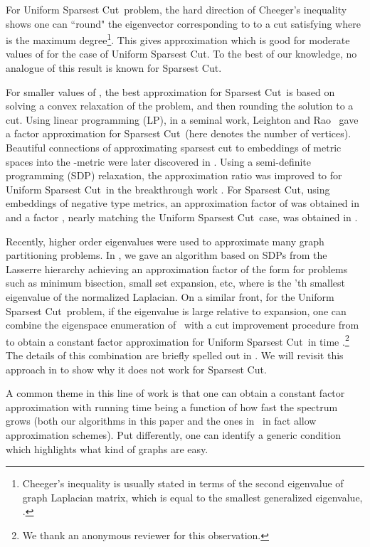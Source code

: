 \documentclass{article}
\newcommand{\usc}{\textsc{\sf Uniform Sparsest Cut}}
\newcommand{\nusc}{\textsc{\sf Non-Uniform Sparsest Cut}}
\newcounter{alg-count}
\renewcommand{\nusc}{{\sc Sparsest Cut}}
\renewcommand{\usc}{{\sc Uniform Sparsest Cut}}
\begin{document}
For \usc\ problem, the hard direction of Cheeger's inequality shows
one can ``round" the eigenvector corresponding to  to a cut
 satisfying  where
 is the maximum degree\footnote{Cheeger's inequality is
  usually stated in terms of the second eigenvalue of graph Laplacian
  matrix, which is equal to the smallest generalized eigenvalue,
  .}.
This gives  approximation which is good for
moderate values of  for the case of \usc. To the best of
our knowledge, no analogue of this result is known for \nusc.

For smaller values of , the best approximation for \nusc\
is based on solving a convex relaxation of the problem, and then
rounding the solution to a cut. Using linear programming (LP), in a
seminal work, Leighton and Rao~\cite{LR} gave a factor 
approximation for \nusc\ (here  denotes the number of
vertices). Beautiful connections of approximating sparsest cut to
embeddings of metric spaces into the -metric were later
discovered in \cite{llr,ar}.  Using a semi-definite programming (SDP)
relaxation, the approximation ratio was improved to 
for \usc \ in the breakthrough work \cite{ARV}. For \nusc, using
 embeddings of negative type metrics, an approximation factor
of  was obtained in \cite{CGR} and a factor
, nearly matching the \usc \ case, was
obtained in \cite{ALN}.

Recently, higher order eigenvalues were used to approximate many graph
partitioning problems. In \cite{gs11-qip}, we gave an algorithm based
on SDPs from the Lasserre hierarchy achieving an approximation factor
of the form  for problems such
as minimum bisection, small set expansion, etc, where
 is the 'th smallest eigenvalue of the
normalized Laplacian.  On a similar front, for the \usc\ problem, if
the  eigenvalue is large relative to expansion, one can
combine the eigenspace enumeration of~\cite{ABS} with a cut
improvement procedure
from~\cite{al08} to obtain a constant factor approximation for \usc\ in time .\footnote{We thank an anonymous reviewer for this
  observation.}  The details of this combination are briefly spelled
out in \Cref{apx:rse}. We will revisit this approach in
 to show why it does not work for \nusc.

A common theme in this line of work is that one can obtain a constant
factor approximation with running time being a function of how fast
the spectrum grows (both our algorithms in this paper and the ones
in~\cite{gs11-qip} in fact allow approximation schemes).  Put
differently, one can identify a generic condition which highlights
what kind of graphs are easy.
\end{document}
